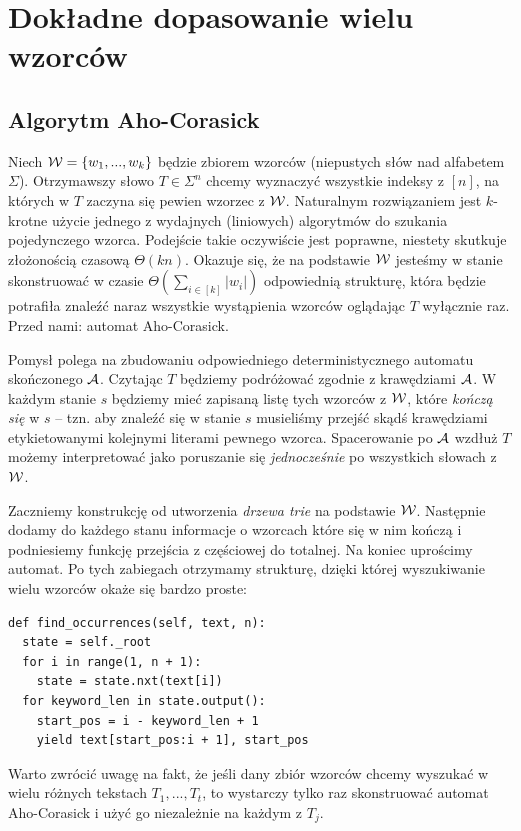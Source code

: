 \section{Dokładne dopasowanie 
wielu wzorców}


\subsection{Algorytm Aho-Corasick}

Niech $\operatorname{\mathcal{W}}=\{w_1,...,w_k\}$ będzie zbiorem wzorców (niepustych słów nad alfabetem $\Sigma$). Otrzymawszy słowo $T\in\Sigma^n$ chcemy wyznaczyć wszystkie indeksy z $[n]$, na których w $T$ zaczyna się pewien wzorzec z $\operatorname{\mathcal{W}}$. Naturalnym rozwiązaniem jest $k$-krotne użycie jednego z wydajnych (liniowych) algorytmów do szukania pojedynczego wzorca. Podejście takie oczywiście jest poprawne, niestety skutkuje złożonością czasową $\Theta(kn)$. Okazuje się, że na podstawie $\operatorname{\mathcal{W}}$ jesteśmy w stanie skonstruować w czasie $\Theta(\sum_{i\in[k]}|w_i|)$ odpowiednią strukturę, która będzie potrafiła znaleźć naraz wszystkie wystąpienia wzorców oglądając $T$ wyłącznie raz. Przed nami: automat Aho-Corasick.

Pomysł polega na zbudowaniu odpowiedniego deterministycznego automatu skończonego $\operatorname{\mathcal{A}}$. Czytając $T$ będziemy podróżować zgodnie z krawędziami $\operatorname{\mathcal{A}}$. W każdym stanie $s$ będziemy mieć zapisaną listę tych wzorców z $\operatorname{\mathcal{W}}$, które \textit{kończą się} w $s$ -- tzn. aby znaleźć się w stanie $s$ musieliśmy przejść skądś krawędziami etykietowanymi kolejnymi literami pewnego wzorca. Spacerowanie po $\operatorname{\mathcal{A}}$ wzdłuż $T$ możemy interpretować jako poruszanie się \textit{jednocześnie} po wszystkich słowach z $\operatorname{\mathcal{W}}$.

Zaczniemy konstrukcję od utworzenia \textit{drzewa trie} na podstawie $\operatorname{\mathcal{W}}$. Następnie dodamy do każdego stanu informacje o wzorcach które się w nim kończą i podniesiemy funkcję przejścia z częściowej do totalnej. Na koniec uprościmy automat. Po tych zabiegach otrzymamy strukturę, dzięki której wyszukiwanie wielu wzorców okaże się bardzo proste:

\begin{verbatim}
def find_occurrences(self, text, n):
  state = self._root
  for i in range(1, n + 1):
    state = state.nxt(text[i])
  for keyword_len in state.output():
    start_pos = i - keyword_len + 1
    yield text[start_pos:i + 1], start_pos
\end{verbatim}

Warto zwrócić uwagę na fakt, że jeśli dany zbiór wzorców chcemy wyszukać w wielu różnych tekstach $T_1,...,T_t$, to wystarczy tylko raz skonstruować automat Aho-Corasick i użyć go niezależnie na każdym z $T_j$.

